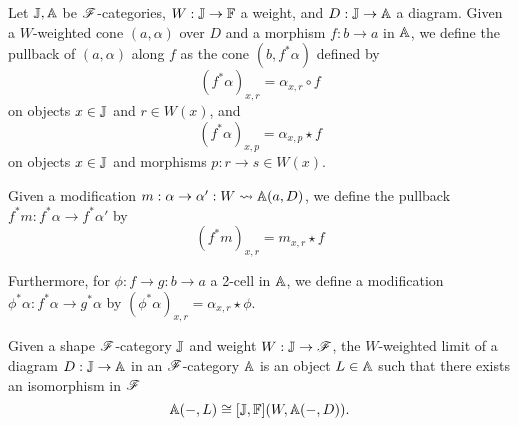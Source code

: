 \documentclass[../thesis.tex]{subfiles}
\begin{document}
\begin{definition}
  Let ${\mathbb{J}}, {\mathbb{A}}$ be ${\mathscr{F}}$-categories, $W : {\mathbb{J}} \to {\mathbb{F}}$ a weight, and $D : {\mathbb{J}} \to {\mathbb{A}}$ a diagram.
  Given a $W$-weighted cone $(a,\alpha)$ over $D$ and a morphism $f : b \to a$ in ${\mathbb{A}}$, we define
  the pullback of $(a,\alpha)$ along $f$ as the cone $(b,f^*\alpha)$ defined by
  \[(f^*\alpha)_{x,r} = \alpha_{x,r} \circ f\]
  on objects $x \in {\mathbb{J}}$ and $r \in W(x)$, and
  \[(f^*\alpha)_{x,p} = \alpha_{x,p} \star f\]
  on objects $x \in {\mathbb{J}}$ and morphisms $p : r \to s \in W(x)$.

  Given a modification $m : \alpha \to \alpha' : W \rightsquigarrow {\mathbb{A}}(a,D)$, we define the pullback $f^*m : f^*\alpha
  \to f^*\alpha'$ by
  \[(f^*m)_{x,r} = m_{x,r} \star f\]


  Furthermore, for $\phi : f \to g : b \to a$ a 2-cell in ${\mathbb{A}}$, we define a modification $\phi^*\alpha :
  f^*\alpha \to g^*\alpha$ by \((\phi^*\alpha)_{x,r} = \alpha_{x,r} \star \phi\).
\end{definition}

\begin{definition}
  Given a shape ${\mathscr{F}}$-category ${\mathbb{J}}$ and weight $W : {\mathbb{J}} \to {\mathscr{F}}$, the $W$-weighted limit of a diagram
  $D : {\mathbb{J}} \to {\mathbb{A}}$ in an ${\mathscr{F}}$-category ${\mathbb{A}}$ is an object $L \in {\mathbb{A}}$ such that there exists an
  isomorphism in ${\mathscr{F}}$
  \[{\mathbb{A}}(-,L) \cong [{\mathbb{J}},{\mathbb{F}}](W,{\mathbb{A}}(-,D)).\]
\end{definition}
\end{document}
